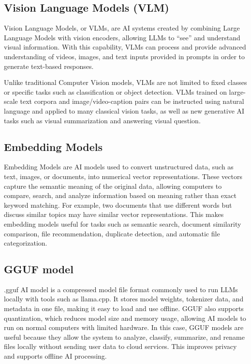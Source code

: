 \documentclass[12pt,oneside,openright,a4paper]{cpe-english-project}
\begin{document}
\subsection{Vision Language Models (VLM)}
Vision Language Models, or VLMs, are AI systems created by combining Large Language Models with vision encoders, allowing LLMs to ``see'' and understand visual information. With this capability, VLMs can process and provide advanced understanding of videos, images, and text inputs provided in prompts in order to generate text-based responses.

Unlike traditional Computer Vision models, VLMs are not limited to fixed classes or specific tasks such as classification or object detection. VLMs trained on large-scale text corpora and image/video-caption pairs can be instructed using natural language and applied to many classical vision tasks, as well as new generative AI tasks such as visual summarization and answering visual question.

\subsection{Embedding Models}
Embedding Models are AI models used to convert unstructured data, such as text, images, or documents, into numerical vector representations. These vectors capture the semantic meaning of the original data, allowing computers to compare, search, and analyze information based on meaning rather than exact keyword matching. For example, two documents that use different words but discuss similar topics may have similar vector representations. This makes embedding models useful for tasks such as semantic search, document similarity comparison, file recommendation, duplicate detection, and automatic file categorization.

\subsection{GGUF model}
.gguf AI model is a compressed model file format commonly used to run LLMs locally with tools such as llama.cpp. It stores model weights, tokenizer data, and metadata in one file, making it easy to load and use offline. GGUF also supports quantization, which reduces model size and memory usage, allowing AI models to run on normal computers with limited hardware. In this case, GGUF models are useful because they allow the system to analyze, classify, summarize, and rename files locally without sending user data to cloud services. This improves privacy and supports offline AI processing.
\end{document}
